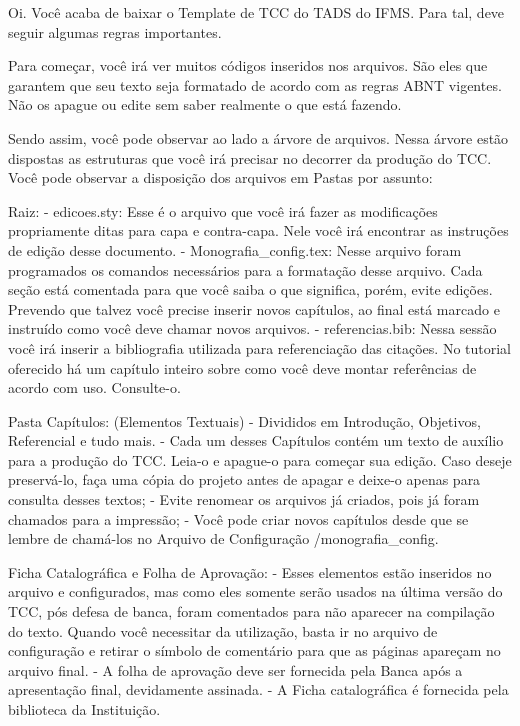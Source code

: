Oi.
Você acaba de baixar o Template de TCC do TADS do IFMS.
Para tal, deve seguir algumas regras importantes.

Para começar, você irá ver muitos códigos inseridos nos arquivos. São eles que garantem que seu texto seja formatado de acordo com as regras ABNT vigentes. Não os apague ou edite sem saber realmente o que está fazendo.

Sendo assim, você pode observar ao lado a árvore de arquivos. Nessa árvore estão dispostas as estruturas que você irá precisar no decorrer da produção do TCC. Você pode observar a disposição dos arquivos em Pastas por assunto:

Raiz: 
- edicoes.sty: Esse é o arquivo que você irá fazer as modificações propriamente ditas para capa e contra-capa. Nele você irá encontrar as instruções de edição desse documento.
- Monografia\_config.tex: Nesse arquivo foram programados os comandos necessários para a formatação desse arquivo. Cada seção está comentada para que você saiba o que significa, porém, evite edições. Prevendo que talvez você precise inserir novos capítulos, ao final está marcado e instruído como você deve chamar novos arquivos.  
- referencias.bib: Nessa sessão você irá inserir a bibliografia utilizada para referenciação das citações. No tutorial oferecido há um capítulo inteiro sobre como você deve montar referências de acordo com uso. Consulte-o.

Pasta Capítulos: (Elementos Textuais)
- Divididos em Introdução, Objetivos, Referencial e tudo mais.
- Cada um desses Capítulos contém um texto de auxílio para a produção do TCC. Leia-o e apague-o para começar sua edição. Caso deseje preservá-lo, faça uma cópia do projeto antes de apagar e deixe-o apenas para consulta desses textos;
- Evite renomear os arquivos já criados, pois já foram chamados para a impressão;
- Você pode criar novos capítulos desde que se lembre de chamá-los no Arquivo de Configuração /monografia\_config.

Ficha Catalográfica e Folha de Aprovação: 
- Esses elementos estão inseridos no arquivo e configurados, mas como eles somente serão usados na última versão do TCC, pós defesa de banca, foram comentados para não aparecer na compilação do texto. Quando você necessitar da utilização, basta ir no arquivo de configuração e retirar o símbolo de comentário para que as páginas apareçam no arquivo final.
- A folha de aprovação deve ser fornecida pela Banca após a apresentação final, devidamente assinada.
- A Ficha catalográfica é fornecida pela biblioteca da Instituição.


